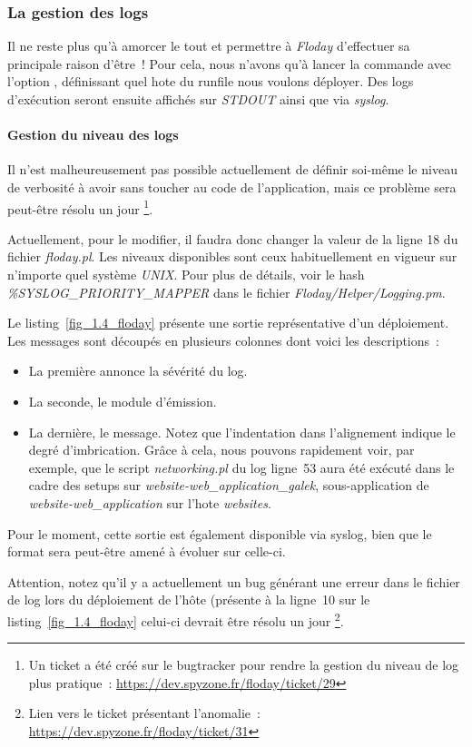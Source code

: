 \subsubsection{La gestion des logs}

Il ne reste plus qu'à amorcer le tout et permettre à \emph{Floday} d'effectuer sa principale raison d'être~!
Pour cela, nous n'avons qu'à lancer la commande  avec l'option , définissant quel \gls{hote} du runfile nous voulons déployer.
Des logs d'exécution seront ensuite affichés sur \emph{STDOUT} ainsi que via \emph{syslog}.

\paragraph{Gestion du niveau des logs}
Il n'est malheureusement pas possible actuellement de définir soi-même le niveau de verbosité à avoir sans toucher au code de l'application, mais ce problème sera peut-être résolu un jour%
\footnote{Un ticket a été créé sur le bugtracker pour rendre la gestion du niveau de log plus pratique~: \url{https://dev.spyzone.fr/floday/ticket/29}}.

Actuellement, pour le modifier, il faudra donc changer la valeur de la ligne 18 du fichier \emph{floday.pl}.
Les niveaux disponibles sont ceux habituellement en vigueur sur n'importe quel système \emph{UNIX}.
Pour plus de détails, voir le hash \emph{\%SYSLOG\_PRIORITY\_MAPPER} dans le fichier \emph{Floday/Helper/Logging.pm}.



Le listing~\ref{fig_1.4_floday} présente une sortie représentative d'un déploiement.
Les messages sont découpés en plusieurs colonnes dont voici les descriptions~:
\begin{itemize}
	\item La première annonce la sévérité du log.
	\item La seconde, le module d'émission.
	\item La dernière, le message. Notez que l'indentation dans l'alignement indique le degré d'imbrication. Grâce à cela, nous pouvons rapidement voir, par exemple, que le script \emph{networking.pl} du log ligne~53 aura été exécuté dans le cadre des setups sur \emph{website-web\_application\_galek}, sous-application de \emph{website-web\_application} sur l'\gls{hote} \emph{websites}.
\end{itemize}

Pour le moment, cette sortie est également disponible via syslog, bien que le format sera peut-être amené à évoluer sur celle-ci.

Attention, notez qu'il y a actuellement un bug générant une erreur dans le fichier de log lors du déploiement de l'hôte (présente à la ligne~10 sur le listing~\ref{fig_1.4_floday} celui-ci devrait être résolu un jour%
\footnote{Lien vers le ticket présentant l'anomalie~: \url{https://dev.spyzone.fr/floday/ticket/31}}.
